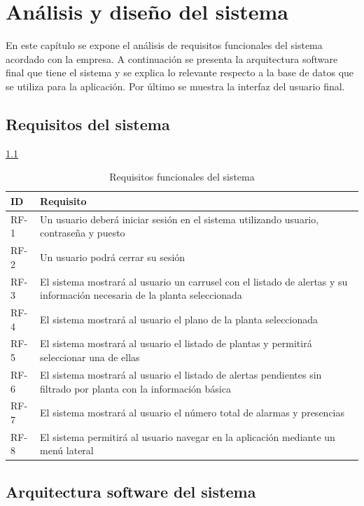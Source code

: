 \chapter{Análisis y diseño del sistema}

En este capítulo se expone el análisis de requisitos funcionales del sistema acordado con la empresa. A continuación se presenta la arquitectura software final que tiene el sistema y se explica lo relevante respecto a la base de datos que se utiliza para la aplicación. Por último se muestra la interfaz del usuario final.

\section{Requisitos del sistema}


\ref{tab:etiqueta_tabla}

\begin{table}[!h]
\centering
\begin{tabular}{|p{1cm}|p{14cm}|}
	\hline
	\textbf{ID} & \textbf{Requisito} \\
	\hline
	RF-1 	& 	Un usuario deberá iniciar sesión en el sistema utilizando usuario, contraseña y puesto	\\
	\hline
	RF-2	&	Un usuario podrá cerrar su sesión	\\
	\hline
	RF-3	&	El sistema mostrará al usuario un carrusel con el listado de alertas y su información necesaria de la planta seleccionada \\
	\hline
	RF-4	&	El sistema mostrará al usuario el plano de la planta seleccionada \\
	\hline
	RF-5	&	El sistema mostrará al usuario el listado de plantas y permitirá seleccionar una de ellas	\\
	\hline
	RF-6	&	El sistema mostrará al usuario el listado de alertas pendientes sin filtrado por planta con la información básica \\
	\hline
	RF-7	&	El sistema mostrará al usuario el número total de alarmas y presencias \\
	\hline
	RF-8	&	El sistema permitirá al usuario navegar en la aplicación mediante un menú lateral \\
	\hline
	\end{tabular}
\caption{Requisitos funcionales del sistema}
\label{tab:etiqueta_tabla}
\end{table}

\section{Arquitectura software del sistema}

